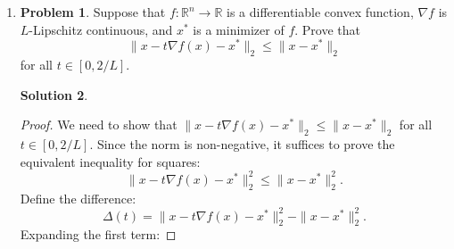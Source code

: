 \documentclass[12pt]{article}
\theoremstyle{definition}
\newtheorem*{solution}{\normalfont\textbf{Solution}}
\newtheorem*{Remark}{Remark}
\newtheorem*{Problem}{\noindent\textbf{Problem}}
\begin{document}
\begin{enumerate}[leftmargin=*]
\begin{solution}
\begin{proof}
                Next  we can prove for $B(r)$.
                If \( x,y \in B(r) \) and \( x \neq y \), select \( \mu > 0 \) so that
                \[
                z := x + \mu(y - x) \in \partial B(2r).
                \]
                Then \( \mu = \frac{|z - x|}{|y - x|} > 1 \) and \( y = \frac{1}{\mu}z + \left(1 - \frac{1}{\mu}\right)x \). Hence
                \begin{align*}
                f(y) &\leq \frac{1}{\mu}f(z) + \left(1 - \frac{1}{\mu}\right)f(x) \\
                &= f(x) + \frac{1}{\mu}\left(f(z) - f(x)\right) \\
                &\leq f(x) + C|y - x|
                \end{align*}
                for \( C := \frac{2}{r}\sup_{B(2r)}|f| \), since \( |z - x| \geq r \). Interchanging \( x,y \), we find that
                \[
                |f(y) - f(x)| \leq C|y - x| \quad (x,y \in B(r)).
                \].
            \end{proof}
            \begin{Remark} 
                This proof  is referenced to 
                [Measure Theorem and Fine Properties of Function, Lawrence C. Evans and Ronald F. Gariepy, 2015].
            \end{Remark}
        \end{solution}
    \item \begin{Problem}
            Suppose that \( f : \mathbb{R}^n \to \mathbb{R} \) is a differentiable convex function, \( \nabla f \) is \( L \)-Lipschitz continuous, and \( x^* \) is a minimizer of \( f \). Prove that 
            \[
            \|x - t\nabla f(x) - x^*\|_2 \leq \|x - x^*\|_2
            \] 
            for all \( t \in [0, 2/L] \).
        \end{Problem}
        \begin{solution}
            \begin{proof}
                We need to show that \(\| x - t\nabla f(x) - x^* \|_2 \leq \| x - x^* \|_2\) for all \(t \in [0, 2/L]\). Since the norm is non-negative, it suffices to prove the equivalent inequality for squares:
                \[
                \| x - t\nabla f(x) - x^* \|_2^2 \leq \| x - x^* \|_2^2.
                \]
                Define the difference:
                \[
                \Delta(t) = \| x - t\nabla f(x) - x^* \|_2^2 - \| x - x^* \|_2^2.
                \]
                Expanding the first term:

\end{proof}
\end{solution}
\end{enumerate}
\end{document}
